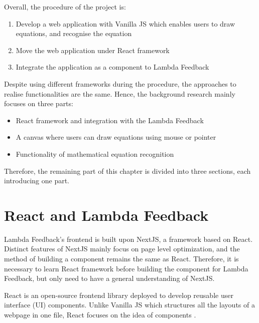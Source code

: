 \documentclass[12pt,twoside]{report}
\begin{document}
Overall, the procedure of the project is:
\begin{enumerate}
    \item Develop a web application with Vanilla JS which enables users to draw equations, and recognise the equation
    \item Move the web application under React framework
    \item Integrate the application as a component to Lambda Feedback
\end{enumerate}


Despite using different frameworks during the procedure, the approaches to realise functionalities are the same. Hence, the background research mainly focuses on three parts:
\begin{itemize}
    \item React framework and integration with the Lambda Feedback
    \item A canvas where users can draw equations using mouse or pointer
    \item Functionality of mathematical equation recognition
\end{itemize}
Therefore, the remaining part of this chapter is divided into three sections, each introducing one part. 

\section{React and Lambda Feedback}
\label{bgIntegrationLF}
Lambda Feedback's frontend is built upon NextJS, a framework based on
React. Distinct features of NextJS mainly focus on page level
optimization, and the method of building a component remains the same as
React. Therefore, it is necessary to learn React framework
before building the component for Lambda Feedback, but only need to have a
general understanding of NextJS.

React is an open-source frontend library deployed to develop reusable user interface (UI) components. Unlike Vanilla JS which structures all the layouts of a webpage in one file, React focuses on the idea of components \cite{rawat2020reactjs}. 
\end{document}
